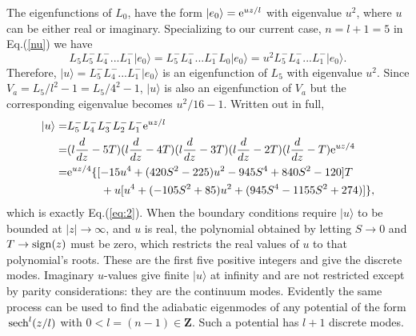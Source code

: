 \documentclass[12pt]{article}
\def\ket#1{|#1\rangle}
\def\sech{{\,\rm sech}}
\def\etothe#1{{\rm e}^{#1}}
\begin{document}
The eigenfunctions of $L_0$, have the form $\ket{e_0}=\etothe{uz/l}$
with eigenvalue $u^2$, where $u$ can be either real or
imaginary. Specializing to our current case, $n=l+1=5$ in
Eq.(\ref{nu}) we have
\begin{equation}
  L_5 L_5 ^- L_4^- ... L_1^- \ket{e_0}
  = L_5 ^- L_4^- ... L_1^- L_0 \ket{e_0}
  =u^2 L_5 ^- L_4^- ... L_1^- \ket{e_0}.
\end{equation}
Therefore, $\ket{u}=L_5 ^- L_4^- ... L_1^- \ket{e_0}$ is an
eigenfunction of $L_5$ with eigenvalue $u^2$. Since $V_a=L_5/l^2-1=L_5/4^2-1$,
$\ket{u}$ is also an eigenfunction of $V_a$ but the corresponding
eigenvalue becomes $u^2/16-1$. Written out in full,
\begin{equation}
\begin{split}
      \ket{u}=& L_5^- L_4^- L_3^- L_2^-L_1^-\etothe{uz/l} \\
      =&(l\frac{d}{dz}-5T)(l\frac{d}{dz}-4T)(l\frac{d}{dz}-3T)(l\frac{d}{dz}-2T)(l\frac{d}{dz}-T)\etothe{uz/4}\\
      =&\mathrm{e}^{uz/4}\{[-15u^4+(420S^2-225)u^2-945S^4+840S^2-120]T\\
      &\quad\quad\quad+u[u^4+(-105S^2+85)u^2+(945S^4-1155S^2+274)]\},
\end{split}
\label{e5}
\end{equation}
which is exactly Eq.(\ref{eq:2}). When the boundary conditions require
$\ket{u}$ to be bounded at $|z| \to \infty$, and $u$ is real, the
polynomial obtained by letting $S\to 0$ and $T\to {\rm sign}(z)$ must
be zero, which restricts the real values of $u$ to that polynomial's
roots. These are the first five positive integers and give the
discrete modes. Imaginary $u$-values give finite $\ket{u}$ at infinity
and are not restricted except by parity considerations: they are the
continuum modes. Evidently the same process can be used to find the
adiabatic eigenmodes of any potential of the form $\sech^{l}(z/l)$
with $0<l=(n-1)\in \mathbf{Z}$. Such a potential has $l+1$ discrete
modes.


\end{document}
